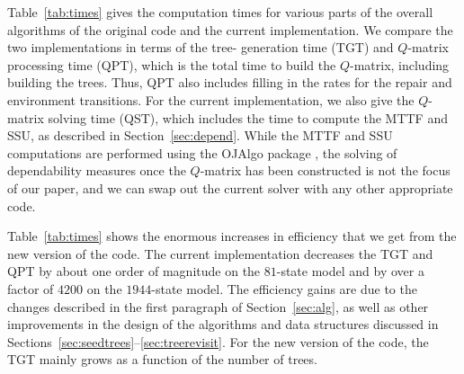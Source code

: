 \documentclass[12pt]{article}
\begin{document}
Table~\ref{tab:times} gives the computation times for various parts of the
overall algorithms of the original code \cite{ING:2009} and the current
implementation. We compare the two implementations in terms of the tree-
generation time (TGT) and $Q$-matrix processing time (QPT), which is the total
time to build the $Q$-matrix, including building the trees. Thus, QPT also
includes filling in the rates for the repair and environment transitions. For
the current implementation, we also give the $Q$-matrix solving time (QST),
which includes the time to compute the MTTF and SSU, as described in
Section~\ref{sec:depend}. While the MTTF and SSU computations are performed
using the OJAlgo package \cite{OJAL:2013}, the solving of dependability
measures once the $Q$-matrix has been constructed is not the focus of our
paper, and we can swap out the current solver with any other appropriate code.

Table~\ref{tab:times} shows the enormous increases in efficiency that we get
from the new version of the code. The current implementation decreases the TGT
and QPT by about one order of magnitude on the $81$-state model and by over a
factor of $4200$ on the $1944$-state model. The efficiency gains are due to
the changes described in the first paragraph of Section~\ref{sec:alg}, as well
as other improvements in the design of the algorithms and data structures
discussed in Sections~\ref{sec:seedtrees}--\ref{sec:treerevisit}. For the new
version of the code, the TGT mainly grows as a function of the number of
trees.



\end{document}
